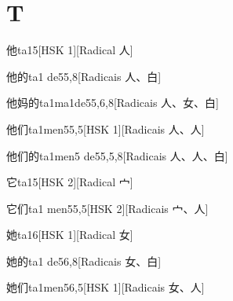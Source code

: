 
\section*{T}

\begin{entry}{他}{ta1}{5}[HSK 1][Radical ⼈]
\end{entry}

\begin{entry}{他的}{ta1 de5}{5,8}[Radicais ⼈、⽩]
\end{entry}

\begin{entry}{他妈的}{ta1ma1de5}{5,6,8}[Radicais ⼈、⼥、⽩]
\end{entry}

\begin{entry}{他们}{ta1men5}{5,5}[HSK 1][Radicais ⼈、⼈]
\end{entry}

\begin{entry}{他们的}{ta1men5 de5}{5,5,8}[Radicais ⼈、⼈、⽩]
\end{entry}

\begin{entry}{它}{ta1}{5}[HSK 2][Radical ⼧]
\end{entry}

\begin{entry}{它们}{ta1 men5}{5,5}[HSK 2][Radicais ⼧、⼈]
\end{entry}

\begin{entry}{她}{ta1}{6}[HSK 1][Radical ⼥]
\end{entry}

\begin{entry}{她的}{ta1 de5}{6,8}[Radicais ⼥、⽩]
\end{entry}

\begin{entry}{她们}{ta1men5}{6,5}[HSK 1][Radicais ⼥、⼈]
\end{entry}

